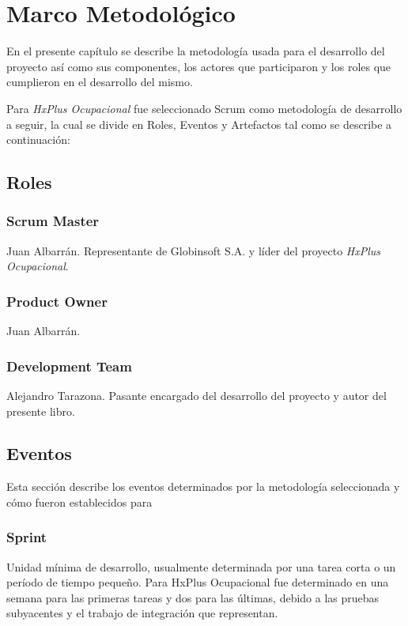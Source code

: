 \chapter{Marco Metodológico}

    En el presente capítulo se describe la metodología usada para el desarrollo del proyecto así como sus componentes, los actores que participaron y los roles que cumplieron en el desarrollo del mismo.

    Para \textit{HxPlus Ocupacional} fue seleccionado Scrum como metodología de desarrollo a seguir, la cual se divide en Roles, Eventos y Artefactos tal como se describe a continuación:

    \section{Roles}
        \subsection{Scrum Master}
        Juan Albarrán. Representante de Globinsoft S.A. y líder del proyecto \textit{HxPlus Ocupacional}.
        
        \subsection{Product Owner}
        Juan Albarrán.
        
        \subsection{Development Team}
        Alejandro Tarazona. Pasante encargado del desarrollo del proyecto y autor del presente libro.
        
    \section{Eventos}
    
    Esta sección describe los eventos determinados por la metodología seleccionada y cómo fueron establecidos para 
    
        \subsection{Sprint}
        
        Unidad mínima de desarrollo, usualmente determinada por una tarea corta o un período de tiempo pequeño. Para HxPlus Ocupacional fue determinado en una semana para las primeras tareas y dos para las últimas, debido a las pruebas subyacentes y el trabajo de integración que representan.
        

